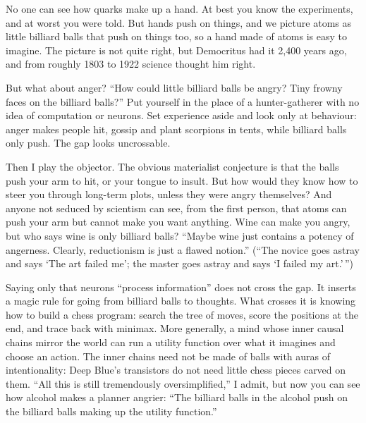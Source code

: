 
No one can see how quarks make up a hand. At best you know the experiments, and at worst you were told. But hands push on things, and we picture atoms as little billiard balls that push on things too, so a hand made of atoms is easy to imagine. The picture is not quite right, but Democritus had it 2,400 years ago, and from roughly 1803 to 1922 science thought him right.

But what about anger? ``How could little billiard balls be angry? Tiny frowny faces on the billiard balls?''  Put yourself in the place of a hunter-gatherer with no idea of computation or neurons. Set experience aside and look only at behaviour: anger makes people hit, gossip and plant scorpions in tents, while billiard balls only push. The gap looks uncrossable. 

Then I play the objector. The obvious materialist conjecture is that the balls push your arm to hit, or your tongue to insult. But how would they know how to steer you through long-term plots, unless they were angry themselves? And anyone not seduced by scientism can see, from the first person, that atoms can push your arm but cannot make you want anything. Wine can make you angry, but who says wine is only billiard balls? ``Maybe wine just contains a potency of angerness. Clearly, reductionism is just a flawed notion.'' (``The novice goes astray and says `The art failed me'; the master goes astray and says `I failed my art.'\,'')

Saying only that neurons ``process information'' does not cross the gap. It inserts a magic rule for going from billiard balls to thoughts. What crosses it is knowing how to build a chess program: search the tree of moves, score the positions at the end, and trace back with minimax. More generally, a mind whose inner causal chains mirror the world can run a utility function over what it imagines and choose an action. The inner chains need not be made of balls with auras of intentionality: Deep Blue's transistors do not need little chess pieces carved on them.  ``All this is still tremendously oversimplified,'' I admit, but now you can see how alcohol makes a planner angrier: ``The billiard balls in the alcohol push on the billiard balls making up the utility function.'' 

